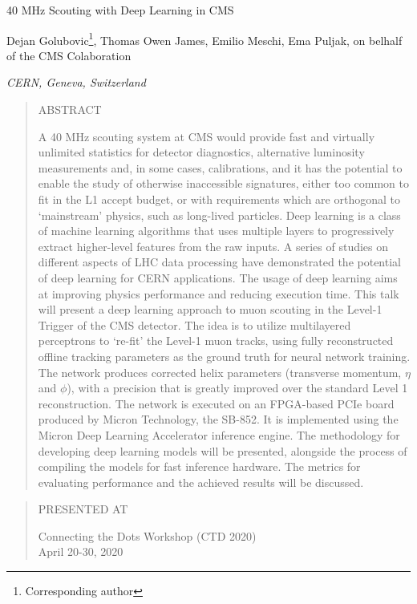 \documentclass[10pt, paper=a4, UKenglish]{article}
\def\Title#1{\begin{center} {\Large #1 } \end{center}}
\def\Author#1{\begin{center}{ \sc #1} \end{center}}
\def\Address#1{\begin{center}{ \it #1} \end{center}}
\newcommand\pubblock{\rightline{\begin{tabular}{l} Proceedings of CTD 2020\\ \pubnumber\\
         \pubdate  \end{tabular}}}
\newenvironment{Abstract}{\begin{quotation} \begin{center} 
             \large ABSTRACT \end{center}\bigskip 
      \begin{center}\begin{large}}{\end{large}\end{center} \end{quotation}}
\newenvironment{Presented}{\begin{quotation} \begin{center} 
             PRESENTED AT\end{center}\bigskip 
      \begin{center}\begin{large}}{\end{large}\end{center} \end{quotation}}
\newcommand\pubnumber{PROC-CTD2020-16}
\newcommand\pubdate{\today}
\def\affiliation{
CERN, Geneva, Switzerland
}
\def\support{\footnote{Work supported by Micron Technology, Inc.}}
\newcommand{\conference}{Connecting the Dots Workshop (CTD 2020)\\
April 20-30, 2020}
\begin{document}

\large
\begin{titlepage}
\pubblock

\vfill
\Title{40 MHz Scouting with Deep Learning in CMS}
\vfill

\Author{Dejan Golubovic\footnote[1]{Corresponding author}, Thomas Owen James, Emilio Meschi, Ema Puljak, on belhalf of the CMS Colaboration}
\Address{\affiliation}
\vfill

\begin{Abstract}
A 40 MHz scouting system at CMS would provide fast and virtually unlimited statistics for detector diagnostics, alternative luminosity  measurements and, in some cases, calibrations, and it has the potential to enable the study of otherwise inaccessible signatures, either too common to fit in the L1 accept budget, or with requirements which are orthogonal to `mainstream' physics, such as long-lived particles.
Deep learning is a class of machine learning algorithms that uses multiple layers to progressively extract higher-level features from the raw inputs. A series of studies on different aspects of LHC data processing have demonstrated the potential of deep learning for CERN applications. The usage of deep learning aims at improving physics performance and reducing execution time.
This talk will present a deep learning approach to muon scouting in the Level-1 Trigger of the CMS detector. The idea is to utilize multilayered perceptrons to `re-fit' the Level-1 muon tracks, using fully reconstructed offline tracking parameters as the ground truth for neural network training. The network produces corrected helix parameters (transverse momentum, $\eta$ and $\phi$), with a precision that is greatly improved over the standard Level 1 reconstruction. The network is executed on an FPGA-based PCIe board produced by Micron Technology, the SB-852. It is implemented using the Micron Deep Learning Accelerator inference engine. The methodology for developing deep learning models will be presented, alongside the process of compiling the models for fast inference hardware. The metrics for evaluating performance and the achieved results will be discussed.
\end{Abstract}

\vfill

\begin{Presented}
\conference
\end{Presented}
\vfill
\end{titlepage}
\def\thefootnote{\fnsymbol{footnote}}
\setcounter{footnote}{0}
%
\end{document}
